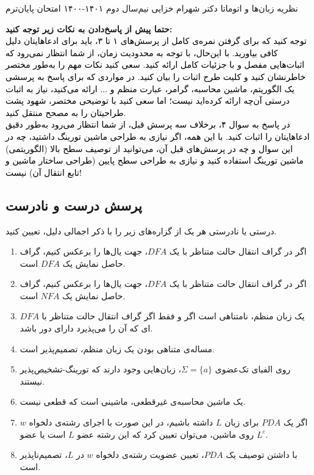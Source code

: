 \documentclass[a4paper,12pt]{article}
\newcounter{problemcounter}
\newcounter{subproblemcounter}
\newcommand{\problem}[1]
{
	\subsection*{
		پرسش
		\arabic{problemcounter} 
		\stepcounter{problemcounter}
		\setcounter{subproblemcounter}{1}
		#1
	}
}
\begin{document}
\handout
{نظریه زبان‌ها و اتوماتا}
{دکتر شهرام خزایی}
{نیم‌سال دوم ۱۴۰۱-۱۴۰۰}
{}
{}
{}
 {امتحان پایان‌ترم}
 
\textbf{ حتما پیش از پاسخ‌دادن به نکات زیر توجه کنید:}\\
\textcolor{black}{ توجه کنید که برای گرفتن نمره‌ی کامل از پرسش‌های ۱ تا ۳، باید برای ادعاهایتان دلیل کافی بیاورید. با این‌حال، با توجه به محدودیت زمان، از شما انتظار نمی‌رود که اثبات‌هایی مفصل و با جزئیات کامل ارائه کنید. سعی کنید نکات مهم را به‌طور مختصر خاطرنشان کنید و کلیت طرح اثبات را بیان کنید. در مواردی که برای پاسخ به پرسشی یک الگوریتم، ماشین محاسبه، گرامر، عبارت منظم و ... ارائه می‌کنید، نیاز به اثبات درستی آن‌چه ارائه کرده‌اید نیست؛ اما سعی کنید با توضیحی مختصر، شهود پشت طراحیتان را به مصحح منتقل کنید.\\
	در پاسخ به سوال ۴، برخلاف سه پرسش قبل، از شما انتظار می‌رود به‌طور دقیق ادعاهایتان را اثبات کنید. با این همه، اگر نیازی به طراحی ماشین تورینگ داشتید، چه در این سوال و چه در پرسش‌های قبل آن، می‌توانید از توصیف سطح بالا (الگوریتمی) ماشین تورینگ استفاده کنید و نیازی به طراحی سطح پایین (طراحی ساختار ماشین و تابع انتقال آن) نیست!}

\problem{درست و نادرست}
درستی یا نادرستی هر یک از گزاره‌های زیر را با ذکر اجمالی دلیل، تعیین کنید.\\
\begin{enumerate}
\item 
 اگر در گراف انتقال حالت متناظر با یک $ DFA$، جهت یال‌ها را برعکس کنیم، گراف حاصل نمایش یک $DFA$ است.
 \item
 اگر در گراف انتقال حالت متناظر با یک $ DFA$، جهت یال‌ها را برعکس کنیم، گراف حاصل نمایش یک $NFA$ است.
\item 
 یک زبان منظم، نامتناهی است اگر و فقط اگر گراف انتقال حالت متناظر با $ DFA$ای که آن را می‌پذیرد دارای دور باشد. 
\item 
مساله‌ی متناهی بودن یک زبان منظم، تصمیم‌پذیر است.
\item 
روی الفبای تک‌عضوی 
$\Sigma=\{a\}$، زبان‌هایی وجود دارند که تورینگ-تشخیص‌پذیر نیستند.
\item 
یک ماشین محاسبه‌ی غیرقطعی، ماشینی است که قطعی نیست.
\item 
اگر یک $PDA$ برای زبان 
$L$
داشته باشیم، در این صورت با اجرای رشته‌ی دلخواه 
$w$
روی ماشین، می‌توان تعیین کرد که این رشته عضو 
$L$
است یا عضو 
$L^c$.
\item 
با داشتن توصیف یک 
$PDA$، 
تعیین عضویت رشته‌ی دلخواه 
$w$
در 
$L$، 
تصمیم‌ناپذیر است.
\end{enumerate}
\end{document}
